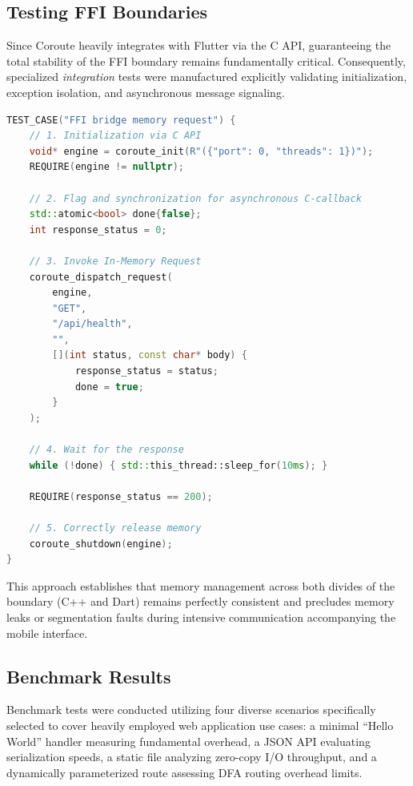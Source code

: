 \subsection{Testing FFI Boundaries}

Since Coroute heavily integrates with Flutter via the C API, guaranteeing the total stability of the FFI boundary remains fundamentally critical. Consequently, specialized \textit{integration} tests were manufactured explicitly validating initialization, exception isolation, and asynchronous message signaling.

\begin{lstlisting}[language=C++, basicstyle=\small\ttfamily, caption={FFI Bridge test}]
TEST_CASE("FFI bridge memory request") {
    // 1. Initialization via C API
    void* engine = coroute_init(R"({"port": 0, "threads": 1})");
    REQUIRE(engine != nullptr);
    
    // 2. Flag and synchronization for asynchronous C-callback
    std::atomic<bool> done{false};
    int response_status = 0;
    
    // 3. Invoke In-Memory Request
    coroute_dispatch_request(
        engine, 
        "GET", 
        "/api/health", 
        "", 
        [](int status, const char* body) {
            response_status = status;
            done = true;
        }
    );
    
    // 4. Wait for the response
    while (!done) { std::this_thread::sleep_for(10ms); }
    
    REQUIRE(response_status == 200);
    
    // 5. Correctly release memory
    coroute_shutdown(engine);
}
\end{lstlisting}

This approach establishes that memory management across both divides of the boundary (C++ and Dart) remains perfectly consistent and precludes memory leaks or segmentation faults during intensive communication accompanying the mobile interface.

\subsection{Benchmark Results}

Benchmark tests were conducted utilizing four diverse scenarios specifically selected to cover heavily employed web application use cases: a minimal ``Hello World'' handler measuring fundamental overhead, a JSON API evaluating serialization speeds, a static file analyzing zero-copy I/O throughput, and a dynamically parameterized route assessing DFA routing overhead limits.

